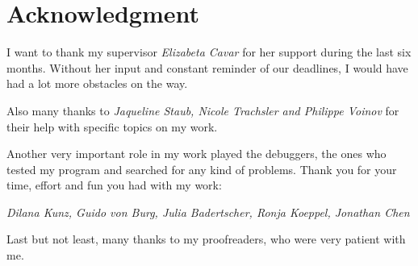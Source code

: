 
\chapter*{Acknowledgment}
I want to thank my supervisor \textit{Elizabeta Cavar} for her support during the last six months.
Without her input and constant reminder of our deadlines, I would have had a lot more obstacles on the way.

Also many thanks to \textit{Jaqueline Staub, Nicole Trachsler and Philippe Voinov} for their help with specific topics on my work.

Another very important role in my work played the debuggers, the ones who tested my program and searched for any kind of problems.
Thank you for your time, effort and fun you had with my work:

\textit{Dilana Kunz, Guido von Burg, Julia Badertscher, Ronja Koeppel, Jonathan Chen}

Last but not least, many thanks to my proofreaders, who were very patient with me.
